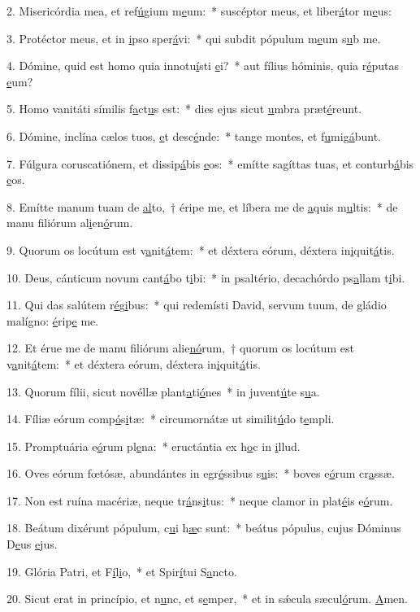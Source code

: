 2. Misericórdia mea, et ref\uline{ú}gium m\uline{e}um:~* suscéptor meus, et liber\uline{á}tor m\uline{e}us:\par 
3. Protéctor meus, et in \uline{i}pso sper\uline{á}vi:~* qui subdit pópulum m\uline{e}um s\uline{u}b me.\par 
4. Dómine, quid est homo quia innotu\uline{í}sti \uline{e}i?~* aut fílius hóminis, quia r\uline{é}putas \uline{e}um?\par 
5. Homo vanitáti símilis f\uline{a}ct\uline{u}s est:~* dies ejus sicut \uline{u}mbra præt\uline{é}reunt.\par 
6. Dómine, inclína cælos tuos, \uline{e}t desc\uline{é}nde:~* tange montes, et f\uline{u}mig\uline{á}bunt.\par 
7. Fúlgura coruscatiónem, et dissip\uline{á}bis \uline{e}os:~* emítte sagíttas tuas, et conturb\uline{á}bis \uline{e}os.\par 
8. Emítte manum tuam de \uline{al}to,~† éripe me, et líbera me de \uline{a}quis m\uline{u}ltis:~* de manu filiórum al\uline{i}en\uline{ó}rum.\par 
9. Quorum os locútum est v\uline{a}nit\uline{á}tem:~* et déxtera eórum, déxtera in\uline{i}quit\uline{á}tis.\par 
10. Deus, cánticum novum cant\uline{á}bo t\uline{i}bi:~* in psaltério, decachórdo ps\uline{a}llam t\uline{i}bi.\par 
11. Qui das salútem r\uline{é}g\uline{i}bus:~* qui redemísti David, servum tuum, de gládio malígno: \uline{é}rip\uline{e} me.\par 
12. Et érue me de manu filiórum alie\uline{nó}rum,~† quorum os locútum est v\uline{a}nit\uline{á}tem:~* et déxtera eórum, déxtera in\uline{i}quit\uline{á}tis.\par 
13. Quorum fílii, sicut novéllæ plant\uline{a}ti\uline{ó}nes~* in juvent\uline{ú}te s\uline{u}a.\par 
14. Fíliæ eórum comp\uline{ó}s\uline{i}tæ:~* circumornátæ ut similit\uline{ú}do t\uline{e}mpli.\par 
15. Promptuária e\uline{ó}rum pl\uline{e}na:~* eructántia ex h\uline{o}c in \uline{i}llud.\par 
16. Oves eórum fœtósæ, abundántes in egr\uline{é}ssibus s\uline{u}is:~* boves e\uline{ó}rum cr\uline{a}ssæ.\par 
17. Non est ruína macériæ, neque tr\uline{á}ns\uline{i}tus:~* neque clamor in plat\uline{é}is e\uline{ó}rum.\par 
18. Beátum dixérunt pópulum, c\uline{u}i h\uline{æ}c sunt:~* beátus pópulus, cujus Dóminus D\uline{e}us \uline{e}jus.\par 
19. Glória Patri, et F\uline{í}l\uline{i}o,~* et Spir\uline{í}tui S\uline{a}ncto.\par 
20. Sicut erat in princípio, et n\uline{u}nc, et s\uline{e}mper,~* et in sǽcula sæcul\uline{ó}rum. \uline{A}men.\par 
